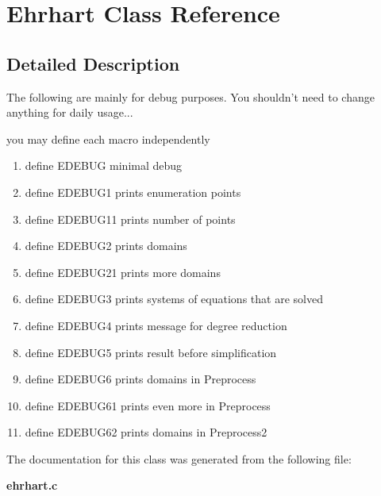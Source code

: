 \section{Ehrhart  Class Reference}
\label{classEhrhart}


\subsection{Detailed Description}
The following are mainly for debug purposes. You shouldn't need to change anything for daily usage...





you may define each macro independently  \begin{enumerate}
\item 
 define EDEBUG minimal debug  \item 
 define EDEBUG1 prints enumeration points \item 
 define EDEBUG11 prints number of points \item 
 define EDEBUG2 prints domains \item 
 define EDEBUG21 prints more domains \item 
 define EDEBUG3 prints systems of equations that are solved \item 
 define EDEBUG4 prints message for degree reduction \item 
 define EDEBUG5 prints result before simplification  \item 
 define EDEBUG6 prints domains in Preprocess  \item 
 define EDEBUG61 prints even more in Preprocess \item 
 define EDEBUG62 prints domains in Preprocess2 \end{enumerate}




The documentation for this class was generated from the following file:\begin{CompactItemize}
\item 
{\bf ehrhart.c}\end{CompactItemize}
